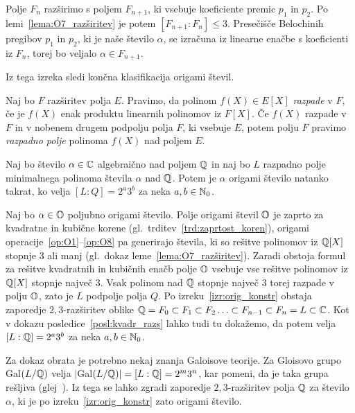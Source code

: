 \begin{dokaz}
    Polje $F_n$ razširimo s poljem $F_{n+1}$, ki vsebuje koeficiente premic $p_1$ in $p_2$. Po lemi~\ref{lema:O7_razširitev} je potem $[F_{n+1}:F_n] \leq 3$. Presečišče Belochinih pregibov $p_1$ in $p_2$, ki je naše število $\alpha$, se izračuna iz linearne enačbe s koeficienti iz $F_n$, torej bo veljalo $\alpha \in F_{n+1}$.
\end{dokaz}

Iz tega izreka sledi končna klasifikacija origami števil.

\begin{definicija}
    Naj bo $F$ razširitev polja $E$. Pravimo, da polinom $f(X) \in E[X]$ \emph{razpade} v $F$, če je $f(X)$ enak produktu linearnih polinomov iz $F[X]$. Če $f(X)$ razpade v $F$ in v nobenem drugem podpolju polja $F$, ki vsebuje $E$, potem polju $F$ pravimo \emph{razpadno polje} polinoma $f(X)$ nad poljem $E$.
\end{definicija}

\begin{izrek}
    \label{izr:orig_razp_polje}
    Naj bo število $\alpha \in \mathbb C$ algebraično nad poljem $\mathbb Q$ in naj bo $L$ razpadno polje minimalnega polinoma števila $\alpha$ nad $\mathbb Q$. Potem je $\alpha$ origami število natanko takrat, ko velja $[L:Q]=2^a3^b$ za neka $a, b \in \mathbb N_0$.
\end{izrek}
\begin{dokaz}
    Naj bo $\alpha \in \mathbb O$ poljubno origami število. Polje origami števil $\mathbb O$ je zaprto za kvadratne in kubične korene (gl.\ trditev~\ref{trd:zaprtost_koren}), origami operacije~\ref{op:O1}--\ref{op:O8} pa generirajo števila, ki so rešitve polinomov iz $\mathbb Q[X]$ stopnje $3$ ali manj (gl.\ dokaz leme~\ref{lema:O7_razširitev}). Zaradi obstoja formul za rešitve kvadratnih in kubičnih enačb polje $\mathbb O$ vsebuje vse rešitve polinomov iz $\mathbb Q[X]$ stopnje največ 3. Vsak polinom nad $\mathbb Q$ stopnje največ $3$ torej razpade v polju $\mathbb O$, zato je $L$ podpolje polja $Q$. Po izreku~\ref{izr:orig_konstr} obstaja zaporedje $2,3$-razširitev oblike $ \mathbb Q = F_0 \subset F_1 \subset F_2 \ldots \subset F_{n-1} \subset F_n = L \subset \mathbb C $. Kot v dokazu posledice~\ref{posl:kvadr_razs} lahko tudi tu dokažemo, da potem velja $[L:\mathbb Q]=2^a3^b$ za neka $a, b \in \mathbb N_0$.

    Za dokaz obrata je potrebno nekaj znanja Galoisove teorije. Za Gloisovo grupo Gal$(L/ \mathbb Q)$ velja $|$Gal$(L/ \mathbb Q)| = [L:\mathbb Q] = 2^m3^n$, kar pomeni, da je taka grupa rešljiva (glej~\cite{burnside1904}). Iz tega se lahko zgradi zaporedje $2,3$-razširitev polja $\mathbb Q$ za število $\alpha$, ki je po izreku~\ref{izr:orig_konstr} zato origami število.
\end{dokaz}

